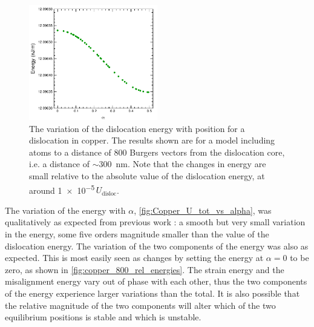 \begin{figure}
\centering
\includegraphics[width=0.5\textwidth]{Copper_800_U_tot}
\caption[Energy variation of a dislocation in copper with the dislocation position.]{The variation of the dislocation energy with position for a dislocation in copper. The results shown are for a model including atoms to a distance of 800 Burgers vectors from the dislocation core, i.e. a distance of $\sim$\SI{300}{\nano\metre}.  Note that the changes in energy are small relative to the absolute value of the dislocation energy, at around \num{1e-5}\,$U_{\text{disloc}}$.\label{fig:Copper_U_tot_vs_alpha}}
\end{figure}

The variation of the energy with $\alpha$, \autoref{fig:Copper_U_tot_vs_alpha}, was qualitatively as expected from previous work \cite{Bulatov1997,Clegg2006}: a smooth but very small variation in the energy, some five orders magnitude smaller than the value of the dislocation energy. The variation of the two components of the energy was also as expected. This is most easily seen as changes by setting the energy at $\alpha=0$ to be zero, as shown in \autoref{fig:copper_800_rel_energies}. The strain energy and the misalignment energy vary out of phase with each other, thus the two components of the energy experience larger variations than the total. It is also possible that the relative magnitude of the two components will alter which of the two equilibrium positions is stable and which is unstable.


